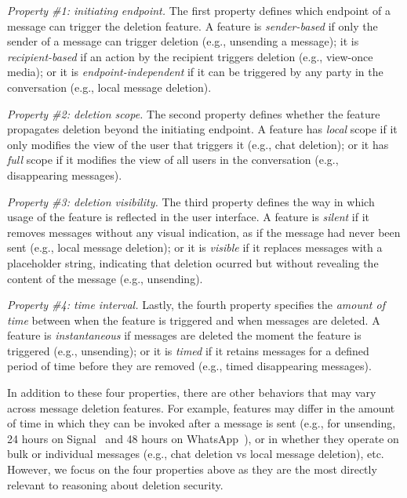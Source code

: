 

\smallskip\emph{Property \#1: initiating endpoint.} The first property defines which endpoint of a message can trigger the deletion feature. A feature is \emph{sender-based} if only the sender of a message can trigger deletion (e.g., unsending a message); it is \emph{recipient-based} if an action by the recipient triggers deletion (e.g., view-once media); or it is \emph{endpoint-independent} if it can be triggered by any party in the conversation (e.g., local message deletion).

\smallskip\emph{Property \#2: deletion scope.} The second property defines whether the feature propagates deletion beyond the initiating endpoint. A feature has \emph{local} scope if it only modifies the view of the user that triggers it (e.g., chat deletion); or it has \emph{full} scope if it modifies the view of all users in the conversation (e.g., disappearing messages).


\smallskip\emph{Property \#3: deletion visibility.} The third property defines the way in which usage of the feature is reflected in the user interface. A feature is \emph{silent} if it removes messages without any visual indication, as if the message had never been sent (e.g., local message deletion); or it is \emph{visible} if it replaces messages with a placeholder string, indicating that deletion ocurred but without revealing the content of the message (e.g., unsending).

\smallskip\emph{Property \#4: time interval.} Lastly, the fourth property specifies the \emph{amount of time} between when the feature is triggered and when messages are deleted. A feature is \emph{instantaneous} if messages are deleted the moment the feature is triggered (e.g., unsending); or it is \emph{timed} if it retains messages for a defined period of time before they are removed (e.g., timed disappearing messages). \smallskip

In addition to these four properties, there are other behaviors that may vary across message deletion features. For example, features may differ in the amount of time in which they can be invoked after a message is sent (e.g., for unsending, 24 hours on Signal~\cite{signal-delete-message} and 48 hours on WhatsApp~\cite{whatsapp-delete-message}), or in whether they operate on bulk or individual messages (e.g., chat deletion vs local message deletion), etc. However, we focus on the four properties above as they are the most directly relevant to reasoning about deletion security.